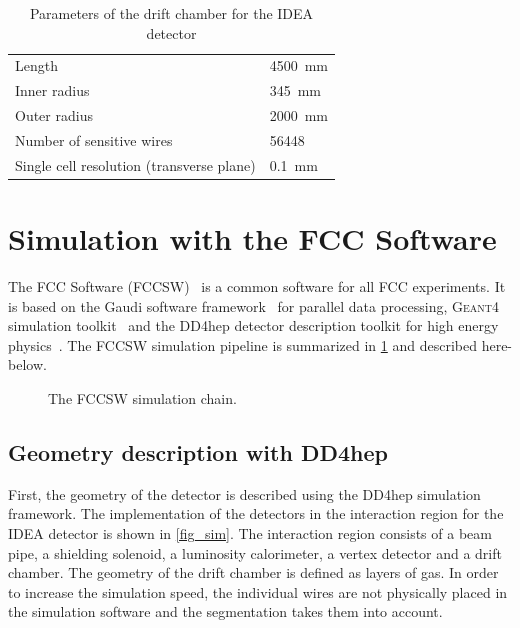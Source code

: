 \documentclass[conference]{IEEEtran}
\begin{document}
\begin{table}[!t]
	\renewcommand{\arraystretch}{1.3}
	\caption{Parameters of the drift chamber for the IDEA detector}
	\label{driftChamberParams}
	\centering
	\begin{tabular}{l l}
		\toprule
		Length & 4500~mm \\
        Inner radius & 345~mm \\
        Outer radius & 2000~mm\\
        Number of sensitive wires & 56448 \\
        Single cell resolution (transverse plane) & 0.1~mm \\
		\bottomrule
	\end{tabular}
\end{table}

\section{Simulation with the FCC Software}

The FCC Software (FCCSW)~\cite{FCCSW} is a common software for all FCC experiments. It is based on the Gaudi software framework~\cite{Gaudi} for parallel data processing, \textsc{Geant4} simulation toolkit~\cite{Geant4} and the DD4hep detector description toolkit for high energy physics~\cite{DD4hep}. The FCCSW simulation pipeline is summarized in \cref{simu_chain} and described here-below.

\begin{figure}[!t]
\centering
\caption{The FCCSW simulation chain.}
\label{simu_chain}
\end{figure}




\subsection{Geometry description with DD4hep}
First, the geometry of the detector is described using the DD4hep simulation framework. The implementation of the detectors in the interaction region for the IDEA detector is shown in \cref{fig_sim}. The interaction region consists of a beam pipe, a shielding solenoid, a luminosity calorimeter, a vertex detector and a drift chamber. The geometry of the drift chamber is defined as layers of gas. In order to increase the simulation speed, the individual wires are not physically placed in the simulation software and the segmentation takes them into account.
\end{document}
